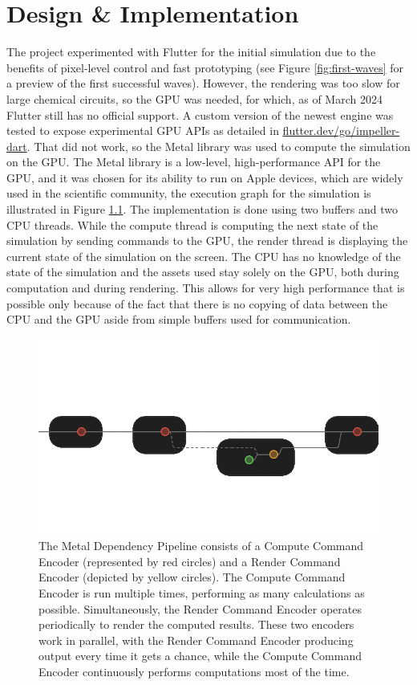 \chapter{Design \& Implementation}
The project experimented with Flutter for the initial simulation due to the benefits of pixel-level control and fast prototyping (see Figure \ref{fig:first-waves} for a preview of the first successful waves). However, the rendering was too slow for large chemical circuits, so the GPU was needed, for which, as of March 2024 Flutter still has no official support. A custom version of the newest engine was tested to expose experimental GPU APIs as detailed in \href{flutter.dev/go/impeller-dart}{flutter.dev/go/impeller-dart}.
That did not work, so the Metal library was used to compute the simulation on the GPU. 
The Metal library is a low-level, high-performance API for the GPU, and it was chosen for its ability to run on Apple devices, which are widely used in the scientific community, the execution graph for the simulation is illustrated in Figure \ref{fig:metal-dependency-pipline}.
The implementation is done using two buffers and two CPU threads.
While the compute thread is computing the next state of the simulation by sending commands to the GPU,
the render thread is displaying the current state of the simulation on the screen.
The CPU has no knowledge of the state of the simulation and the assets used stay solely on the GPU, both 
during computation and during rendering. This allows for very high performance that is possible only because
of the fact that there is no copying of data between the CPU and the GPU aside from simple buffers used for communication.


\begin{figure}
    \centering
    \includegraphics[width=0.5\linewidth]{metal-pipeline.png}
    \caption{The Metal Dependency Pipeline consists of a Compute Command Encoder (represented by red circles) and a Render Command Encoder (depicted by yellow circles). The Compute Command Encoder is run multiple times, performing as many calculations as possible. Simultaneously, the Render Command Encoder operates periodically to render the computed results. These two encoders work in parallel, with the Render Command Encoder producing output every time it gets a chance, while the Compute Command Encoder continuously performs computations most of the time.}
    \label{fig:metal-dependency-pipline}
\end{figure}

